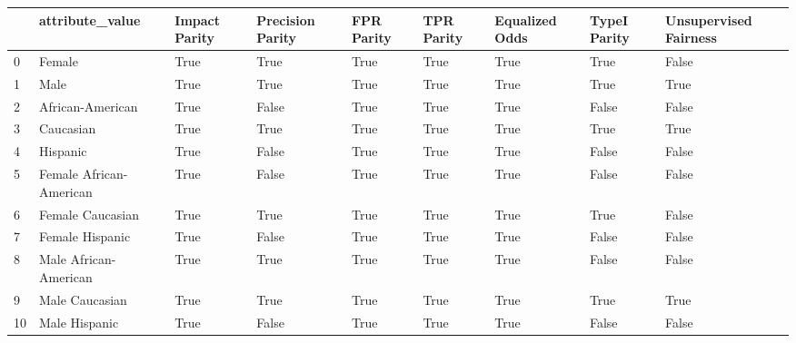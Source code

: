 \begin{tabular}{lllllllll}
\toprule
{} &          attribute\_value &  Impact Parity &  Precision Parity &  FPR Parity &  TPR Parity &  Equalized Odds &  TypeI Parity &  Unsupervised Fairness \\
\midrule
0  &                   Female &           True &              True &        True &        True &            True &          True &                  False \\
1  &                     Male &           True &              True &        True &        True &            True &          True &                   True \\
2  &         African-American &           True &             False &        True &        True &            True &         False &                  False \\
3  &                Caucasian &           True &              True &        True &        True &            True &          True &                   True \\
4  &                 Hispanic &           True &             False &        True &        True &            True &         False &                  False \\
5  &  Female African-American &           True &             False &        True &        True &            True &         False &                  False \\
6  &         Female Caucasian &           True &              True &        True &        True &            True &          True &                  False \\
7  &          Female Hispanic &           True &             False &        True &        True &            True &         False &                  False \\
8  &    Male African-American &           True &              True &        True &        True &            True &         False &                  False \\
9  &           Male Caucasian &           True &              True &        True &        True &            True &          True &                   True \\
10 &            Male Hispanic &           True &             False &        True &        True &            True &         False &                  False \\
\bottomrule
\end{tabular}
